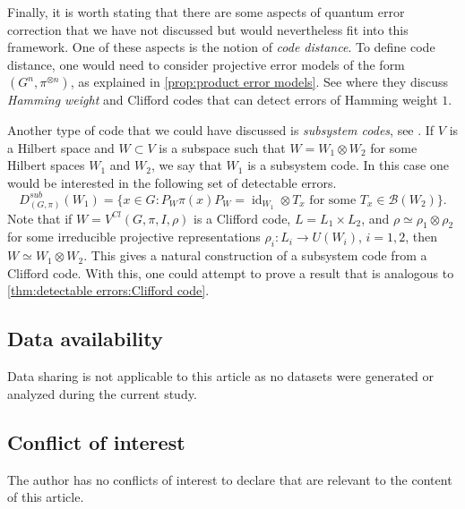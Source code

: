 \documentclass[11pt, oneside, reqno]{amsart}
\newcommand{\calB}{\mathcal{B}}
\newcommand{\id}{\operatorname{id}}
\theoremstyle{definition}
\theoremstyle{plain}
\theoremstyle{remark}
\begin{document}
Finally, it is worth stating that there are some aspects of quantum error correction that we have not discussed but would nevertheless fit into this framework. One of these aspects is the notion of \emph{code distance}. To define code distance, one would need to consider projective error models of the form $(G^n,\pi^{\otimes n})$, as explained in \cref{prop:product error models}. See \cite[Section 5]{GrasslMartínezNicolás10} where they discuss \emph{Hamming weight} and Clifford codes that can detect errors of Hamming weight $1$.

Another type of code that we could have discussed is \emph{subsystem codes}, see \cite{KribsLaflammePoulin2005}. If $V$ is a Hilbert space and $W \subset V$ is a subspace such that $W = W_1 \otimes W_2$ for some Hilbert spaces $W_1$ and $W_2$, we say that $W_1$ is a subsystem code. In this case one would be interested in the following set of detectable errors.
\begin{equation*}
    D^{sub}_{(G,\pi)}(W_1) = \{ x \in G \colon P_W \pi(x) P_W = \id_{W_1} \otimes T_x \text{ for some } T_x \in \calB(W_2) \}.
\end{equation*}
Note that if $W = V^{Cl}(G,\pi,I,\rho)$ is a Clifford code, $L = L_1 \times L_2$, and $\rho \simeq \rho_1 \otimes \rho_2$ for some irreducible projective representations $\rho_i \colon L_i \to U(W_i)$, $i = 1,2$, then $W \simeq W_1 \otimes W_2$. This gives a natural construction of a subsystem code from a Clifford code. With this, one could attempt to prove a result that is analogous to \cref{thm:detectable errors:Clifford code}.

\subsection*{Data availability}

Data sharing is not applicable to this article as no datasets were generated or analyzed during the current study.

\subsection*{Conflict of interest}

The author has no conflicts of interest to declare that are relevant to the content of this article.

\printbibliography
\end{document}
